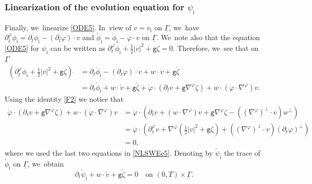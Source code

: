 \documentclass[10pt]{amsart}
\newcommand{\gr}{{\mathtt g}}
\newcommand{\dt}{\partial_t}
\newcommand{\ul}[1]{\underline{#1}}
\newcommand{\itGamma}{\mathit{\Gamma}}
\theoremstyle{definition}
\begin{document}
\subsubsection{Linearization of the evolution equation for $\psi_\mathrm{i}$}
Finally, we~linearize \eqref{ODE5}. In~view of $v=v_\mathrm{i}$ on $\ul{\itGamma}$, we~have $\dt^\varphi\phi_\mathrm{i}=\dt\phi_\mathrm{i}-(\dt\varphi)\cdot v$ and
$\check{\phi}_\mathrm{i}=\dot{\phi}_\mathrm{i}-\dot{\varphi}\cdot v$ on $\ul{\itGamma}$. We~note also that the equation \eqref{ODE5} for $\psi_\mathrm{i}$ can be written as $\dt^\varphi\phi_\mathrm{i}+\tfrac12|v|^2+\gr\zeta=0$.
Therefore, we~see that on $\ul{\itGamma}$
\begin{align*}
(\dt^\varphi\phi_\mathrm{i}+\tfrac12|v|^2+\gr\zeta)\,\dot{}
&= \dt\dot{\phi}_\mathrm{i}-(\dt\dot{\varphi})\cdot v + w\cdot\dot{v}+\gr\dot{\zeta} \\
&= \dt\check{\phi}_\mathrm{i}+w\cdot\check{v}+\gr\check{\zeta} + \dot{\varphi}\cdot(\dt v+\gr\nabla^\varphi\zeta) + w\cdot(\dot{\varphi}\cdot\nabla^\varphi)v.
\end{align*}
Using the identity \eqref{F2} we notice that
\begin{align*}
\dot{\varphi}\cdot(\dt v+\gr\nabla^\varphi\zeta) + w\cdot(\dot{\varphi}\cdot\nabla^\varphi)v
&= \dot{\varphi}\cdot(\dt v+(w\cdot\nabla^\varphi)v+\gr\nabla^\varphi\zeta - ((\nabla^\varphi)^\perp\cdot v)w^\perp) \\
&= \dot{\varphi}\cdot(\dt^\varphi v+\nabla^\varphi(\tfrac12|v|^2+\gr\zeta) + ((\nabla^\varphi)^\perp\cdot v)(\dt\varphi)^\perp) \\
&= 0,
\end{align*}
where we used the last two equations in \eqref{NLSWEe5}.
Denoting by $\check{\psi}_\mathrm{i}$ the trace of $\check{\phi}_\mathrm{i}$ on $\ul{\itGamma}$, we~obtain
\begin{equation}\label{LODE1}
\dt\check{\psi}_\mathrm{i}+w\cdot\check{v}+\gr\check{\zeta}=0 \quad\text{on } (0,T)\times\ul{\itGamma}.
\end{equation}
\end{document}
